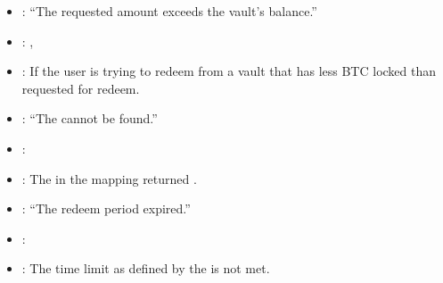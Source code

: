 \documentclass[a4paper,10pt,english]{sphinxmanual}
\begin{document}
\begin{itemize}
\item {} 
: “The requested amount exceeds the vault’s balance.”

\item {} 
: {\hyperref[\detokenize{spec/redeem:requestredeem}]{}}, {\hyperref[\detokenize{spec/redeem:liquidationredeem}]{}}

\item {} 
: If the user is trying to redeem from a vault that has less BTC locked than requested for redeem.

\end{itemize}

\begin{itemize}
\item {} 
: “The  cannot be found.”

\item {} 
: {\hyperref[\detokenize{spec/redeem:executeredeem}]{}}

\item {} 
: The  in the  mapping returned .

\end{itemize}

\begin{itemize}
\item {} 
: “The redeem period expired.”

\item {} 
: {\hyperref[\detokenize{spec/redeem:executeredeem}]{}}

\item {} 
: The time limit as defined by the  is not met.

\end{itemize}
\end{document}
